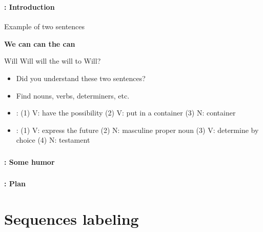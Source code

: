 \documentclass[xcolor=table]{beamer}
\subtitle[05- PoS tagging]{Chapter 05\\Part-of-speech tagging}
\begin{document}
	
\begin{frame}
	\frametitle{\inserttitle}
	\framesubtitle{\insertshortsubtitle: Introduction}

	\begin{exampleblock}{Example of two sentences}
		\begin{center}
			\Huge\bfseries
			We can can the can
			
			Will Will will the will to Will?
		\end{center}
	\end{exampleblock}
	
	\begin{itemize}
		\item Did you understand these two sentences?
		\item Find nouns, verbs, determiners, etc.
		\item {}: (1) V: have the possibility (2) V: put in a container (3) N: container
		\item {}: (1) V: express the future (2) N: masculine proper noun (3) V: determine by choice (4) N: testament
	\end{itemize}

\end{frame}

\begin{frame}
	\frametitle{\inserttitle}
	\framesubtitle{\insertshortsubtitle: Some humor}

	\begin{center}
	\end{center}

\end{frame}

\begin{frame}
	\frametitle{\inserttitle}
	\framesubtitle{\insertshortsubtitle: Plan}

	\begin{multicols}{2}
	\tableofcontents
	\end{multicols}

\end{frame}

\section{Sequences labeling}
\end{document}
